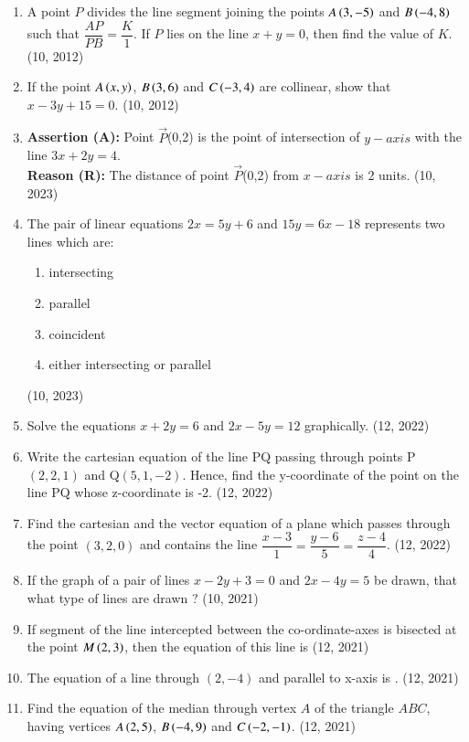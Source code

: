 \begin{enumerate}[label=\thesubsection.\arabic*, ref=\thesubsection.\theenumi]
\item A point $P$ divides the line segment joining the points $A\left(3,-5\right)$ and $B\left(-4,8\right)$ such that $\dfrac{AP}{PB} = \dfrac{K}{1}$. If $P$ lies on the line $x + y = 0$, then find the value of $K$. 
\hfill (10, 2012)
\item If the point $A\left(x,y\right)$, $B\left(3,6\right)$ and $C\left(-3,4\right)$ are collinear, show that $x - 3y + 15 = 0$. 
\hfill (10, 2012)
\item \textbf{Assertion (A):} Point $\vec{P}$(0,2) is the point of intersection of $y-axis$ with  the line $3x+2y=4$.\\
    \textbf{Reason (R):} The distance of point $\vec{P}$(0,2) from $x-axis$ is 2 units. \hfill (10, 2023)
  \item The pair of linear equations $2x=5y+6$ and $15y=6x-18$ represents two lines which are:
      \begin{enumerate}
        \item intersecting
        \item parallel
        \item coincident
        \item either intersecting or parallel
      \end{enumerate} \hfill (10, 2023)
\item Solve the equations $x+2y=6$ and $2x-5y=12$ graphically. \hfill (12, 2022)
\item Write the cartesian equation of the line PQ passing through points P$(2,2,1)$ and Q$(5,1,-2)$. Hence, find the y-coordinate of the point on the line PQ whose z-coordinate is -2. \hfill (12, 2022)
\item Find the cartesian and the vector equation of a plane which passes through the point $(3,2,0)$ and contains the line $\dfrac{x-3}{1}=\dfrac{y-6}{5}=\dfrac{z-4}{4}$. \hfill (12, 2022)
\item If the graph of a pair of lines $ x - 2y + 3 = 0 $ and $ 2x - 4y = 5 $ be drawn, that what type of lines are drawn ? \hfill (10, 2021)
\item If segment of the line intercepted between the co-ordinate-axes is bisected
at the point $M\left(2, 3\right)$, then the equation of this line is
\hfill (12, 2021)
\item The equation of a line through $(2,-4)$ and parallel to x-axis is \underline{\hspace{2cm}}. \hfill (12, 2021)

\item Find the equation of the median through vertex $A$ of the triangle $ABC$, having vertices $A\left(2,5\right)$, $B\left(-4,9\right)$ and $C\left(-2, -1\right)$. \hfill (12, 2021)
\end{enumerate}
